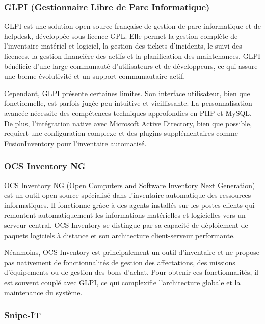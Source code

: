 \subsubsection{GLPI (Gestionnaire Libre de Parc Informatique)}

GLPI est une solution open source française de gestion de parc informatique et de helpdesk, développée sous licence GPL. Elle permet la gestion complète de l'inventaire matériel et logiciel, la gestion des tickets d'incidents, le suivi des licences, la gestion financière des actifs et la planification des maintenances. GLPI bénéficie d'une large communauté d'utilisateurs et de développeurs, ce qui assure une bonne évolutivité et un support communautaire actif.

Cependant, GLPI présente certaines limites. Son interface utilisateur, bien que fonctionnelle, est parfois jugée peu intuitive et vieillissante. La personnalisation avancée nécessite des compétences techniques approfondies en PHP et MySQL. De plus, l'intégration native avec Microsoft Active Directory, bien que possible, requiert une configuration complexe et des plugins supplémentaires comme FusionInventory pour l'inventaire automatisé.

\subsubsection{OCS Inventory NG}

OCS Inventory NG (Open Computers and Software Inventory Next Generation) est un outil open source spécialisé dans l'inventaire automatique des ressources informatiques. Il fonctionne grâce à des agents installés sur les postes clients qui remontent automatiquement les informations matérielles et logicielles vers un serveur central. OCS Inventory se distingue par sa capacité de déploiement de paquets logiciels à distance et son architecture client-serveur performante.

Néanmoins, OCS Inventory est principalement un outil d'inventaire et ne propose pas nativement de fonctionnalités de gestion des affectations, des missions d'équipements ou de gestion des bons d'achat. Pour obtenir ces fonctionnalités, il est souvent couplé avec GLPI, ce qui complexifie l'architecture globale et la maintenance du système.

\subsubsection{Snipe-IT}

